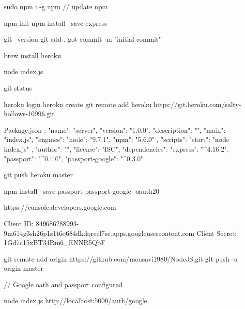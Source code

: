 


sudo npm i -g npm  // update npm

npm init
npm install --save express

git --version
git add .
got commit -m "initial commit"

brew install heroku

node index.js

git status

heroku login
heroku create
git remote add heroku https://git.heroku.com/salty-hollows-10996.git

Package.json :
{
	"name": "server",
	"version": "1.0.0",
	"description": "",
	"main": "index.js",
	"engines": {
		"node": "9.7.1",
		"npm": "5.6.0"
	},
	"scripts": {
		"start": "node index.js"
	},
	"author": "",
	"license": "ISC",
	"dependencies": {
		"express": "^4.16.2",
		"passport": "^0.4.0",
		"passport-google": "^0.3.0"
	}
}


git push heroku master

npm install --save passport passport-google -oauth20

https://console.developers.google.com

Client ID: 849686288993-9m614g3sh26p1s1t6q684dkdqreel7se.apps.googleusercontent.com
Client Secret: 1Gd7c15xBT34Rm6_ENNR5QbF

git remote add origin https://github.com/mousavi1980/NodeJS.git
git push -u origin master

// Google oath and passport configured

node index.js
http://localhost:5000/auth/google